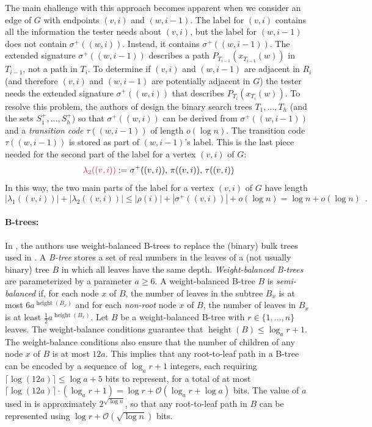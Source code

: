 \documentclass{patmorin}
\makeatletter
\renewcommand{\ge}{\geqslant}
\renewcommand{\le}{\leqslant}
\DeclareMathOperator{\height}{height}
\newcommand{\defin}[1]{\emph{\textcolor{brightmaroon}{#1}}}
\def\mathcolor#1#{\@mathcolor{#1}}
\def\@mathcolor#1#2#3{%
  \protect\leavevmode
  \begingroup
    \color#1{#2}#3%
  \endgroup
}
\newcommand{\mathdefin}[1]{\mathcolor{brightmaroon}{#1}}
\newcommand{\Oh}{\mathcal{O}}
\makeatother
\begin{document}
  The main challenge with this approach becomes apparent when we consider an edge of $G$ with endpoints $(v,i)$ and $(w,i-1)$.
  The label for $(v,i)$ contains all the information the tester needs about $(v,i)$, but the label for $(w,i-1)$ does not contain $\sigma^+((w,i))$.
  Instead, it contains $\sigma^+((w,i-1))$.  The extended signature $\sigma^+((w,i-1))$ describes a path $P_{T_{i-1}}(x_{T_{i-1}}(w))$ in $T_{i-1}$, not a path in $T_i$.  To determine if $(v,i)$ and $(w,i-1)$ are adjacent in $R_i$ (and therefore $(v,i)$ and $(w,i-1)$ are potentially adjacent in $G$) the tester needs the extended signature $\sigma^+((w,i))$ that describes $P_{T_i}(x_{T_i}(w))$.  To resolve this problem, the authors of \cite{dujmovic.esperet.ea:adjacency} design the binary search trees $T_1,\ldots,T_h$ (and the sets $S^+_1,\ldots,S^+_h$) so that $\sigma^+((w,i))$ can be derived from $\sigma^+((w,i-1))$ and a \defin{transition code} \defin{$\tau((w,i-1))$} of length $o(\log n)$. The transition code $\tau((w,i-1))$ is stored as part of $(w,i-1)$'s label.
  This is the last piece needed for the second part of the label for a vertex $(v,i)$ of $G$:
  \[
    \mathdefin{\lambda_2((v,i))} := \sigma^+((v,i)),\, \pi((v,i)),\, \tau((v,i))
  \]
  In this way, the two main parts of the label for a vertex $(v,i)$ of $G$ have length
  \[
      |\lambda_1((v,i))|+|\lambda_2((v,i))| \le |\rho(i)| + |\sigma^+((v,i))| + o(\log n) = \log n + o(\log n) \enspace .
  \]

  \paragraph{B-trees:}
  In \cite{gawrychowski.janczewski:simpler}, the authors use weight-balanced B-trees to replace the (binary) bulk trees used in \cite{dujmovic.esperet.ea:adjacency}.
  A \defin{B-tree} stores a set of real numbers in the leaves of a (not usually binary) tree $B$ in which all leaves have the same depth.
  \defin{Weight-balanced B-trees} are parameterized by a parameter $a\ge 6$.  A weight-balanced B-tree $B$ is \defin{semi-balanced} if, for each node $x$ of $B$, the number of leaves in the subtree $B_x$ is at most $6a^{\height(B_x)}$ and for each \emph{non-root} node $x$ of $B$, the number of leaves in $B_x$ is at least $\tfrac{1}{2}a^{\height(B_x)}$.
  Let $B$ be a weight-balanced B-tree with $r\in \{1,\ldots,n\}$ leaves.  The weight-balance conditions guarantee that $\height(B)\le \log_a r + 1$.
  The weight-balance conditions also ensure that the number of children of any node $x$ of $B$ is at most $12a$.
  This implies that any root-to-leaf path in a B-tree can be encoded by a sequence of $\log_a r+1$ integers, each requiring $\lceil\log(12a)\rceil\le \log a + 5$ bits to represent, for a total of at most $\lceil\log(12a)\rceil\cdot(\log_a r+1)=\log r + \Oh(\log_a r + \log a)$ bits.
  The value of $a$ used in \cite{gawrychowski.janczewski:simpler} is approximately $2^{\sqrt{\log n}}$, so that any root-to-leaf path in $B$ can be represented using $\log r + \Oh(\sqrt{\log n})$ bits.
\end{document}
